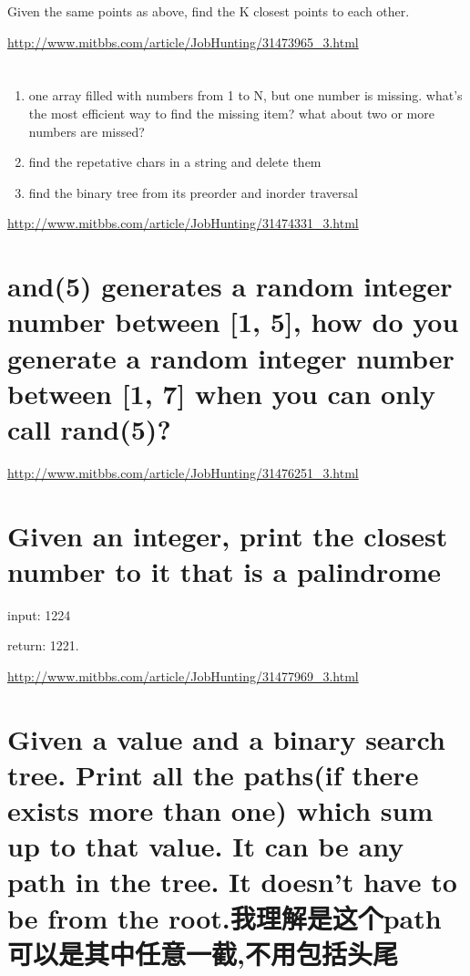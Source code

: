 \documentclass[12pt]{book}
\begin{document}
Given the same points as above, find the K closest points to each other.

\url{http://www.mitbbs.com/article/JobHunting/31473965_3.html}

\section{}
\label{sec-24-7}
\begin{enumerate}
\item one array filled with numbers from 1 to N, but one number is missing. what's the most efficient way to find the missing item? what about two or more numbers are missed?

\item find the repetative chars in a string and delete them

\item find the binary tree from its preorder and inorder traversal
\end{enumerate}

\url{http://www.mitbbs.com/article/JobHunting/31474331_3.html}

\section{and(5) generates a random integer number between [1, 5], how do you generate a random integer number between [1, 7] when you can only call rand(5)?}
\label{sec-24-8}

\url{http://www.mitbbs.com/article/JobHunting/31476251_3.html}

\section{Given an integer, print the closest number to it that is a palindrome}
\label{sec-24-9}

input: 1224 

return: 1221.

\url{http://www.mitbbs.com/article/JobHunting/31477969_3.html}

\section{Given a value and a binary search tree. Print all the paths(if there exists more than one) which sum up to that value. It can be any path in the tree. It doesn't have to be from the root.我理解是这个path可以是其中任意一截,不用包括头尾}
\label{sec-24-10}
\end{document}

